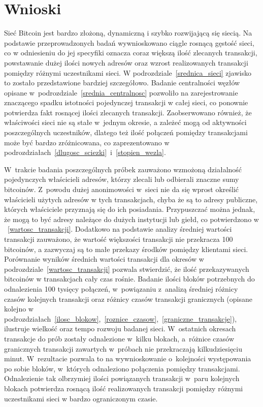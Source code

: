 \documentclass[12pt, twoside, final, openany]{mgr}
\begin{document}
\section{Wnioski}

Sieć Bitcoin jest bardzo złożoną, dynamiczną i szybko rozwijającą się siecią. Na podstawie przeprowadzonych badań wywnioskowano ciągle rosnącą gęstość sieci, co w odniesieniu do jej specyfiki oznacza coraz większą ilość zlecanych transakcji, powstawanie dużej ilości nowych adresów oraz wzrost realizowanych transakcji pomiędzy różnymi uczestnikami sieci. W podrozdziale~\ref{srednica_sieci} zjawisko to zostało przedstawione bardziej szczegółowo. Badanie centralności węzłów opisane w~podrozdziale~\ref{srednia_centralnosc} pozwoliło na zarejestrowanie znaczącego spadku istotności pojedynczej transakcji w całej sieci, co ponownie potwierdza fakt rosnącej ilości zlecanych transakcji. Zaobserwowano również, że właściwości sieci nie są stałe w~jednym okresie, a zależeć mogą od aktywności poszczególnych uczestników, dlatego też ilość połączeń pomiędzy transakcjami może być bardzo zróżnicowana, co zaprezentowano w podrozdziałach~\ref{dlugosc_sciezki}~i~\ref{stopien_wezla}. 

\indent W~trakcie badania poszczególnych próbek zauważono wzmożoną działalność pojedynczych właścicieli adresów, którzy zlecali lub odbierali znaczne sumy bitcoinów. Z~powodu dużej anonimowości w~sieci nie da się wprost określić właścicieli użytych adresów w tych transakcjach, chyba że są to adresy publiczne, których właściciele przyznają się do ich posiadania. Przypuszczać można jednak, że mogą to być adresy należące do dużych instytucji lub giełd, co potwierdzono w ~\ref{wartosc_transakcji}. Dodatkowo na podstawie analizy średniej wartości transakcji zauważono, że wartość większości transakcji nie przekracza 100 bitcoinów, a zazwyczaj są to małe przekazy środków pomiędzy klientami sieci. Porównanie wyników średnich wartości transakcji dla okresów w podrozdziale~\ref{wartosc_transakcji} pozwala stwierdzić, że ilość przekazywanych bitcoinów w transakcjach cały czas rośnie. Badanie ilości bloków potrzebnych do odnalezienia 100 tysięcy połączeń, w~powiązaniu z~analizą średniej różnicy czasów kolejnych transakcji oraz różnicy czasów transakcji granicznych (opisane kolejno w podrozdziałach~\ref{ilosc_blokow},~\ref{roznice_czasow},~\ref{graniczne_transakcje}), ilustruje wielkość oraz tempo rozwoju badanej sieci. W~ostatnich okresach transakcje do prób zostały odnalezione w~kilku blokach, a~różnice czasów granicznych transakcji zawartych w~próbach nie przekraczają kilkudziesięciu minut. W~rezultacie pozwala to na wywnioskowanie o~kolejności występowania po sobie bloków, w~których odnaleziono połączenia pomiędzy transakcjami. Odnalezienie tak olbrzymiej ilości powiązanych transakcji w~paru kolejnych blokach potwierdza rosnącą ilość realizowanych transakcji pomiędzy różnymi uczestnikami sieci w bardzo ograniczonym czasie.
\end{document}
